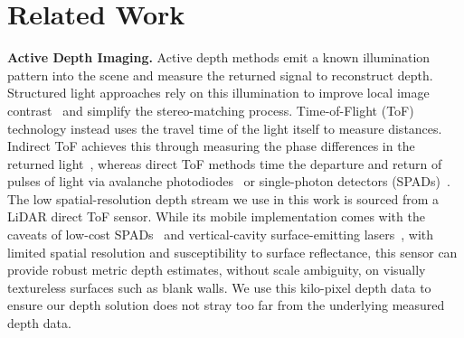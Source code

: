 \section{Related Work}
\vspace{0.5em}\noindent\textbf{Active Depth Imaging.}\hspace{0.1em}
Active depth methods emit a known illumination pattern into the scene and measure the returned signal to reconstruct depth. Structured light approaches rely on this illumination to improve local image contrast~\cite{zhang2018high, scharstein2003high} and simplify the stereo-matching process. Time-of-Flight (ToF) technology instead uses the travel time of the light itself to measure distances. Indirect ToF achieves this through measuring the phase differences in the returned light~\cite{lange20003d}, whereas direct ToF methods time the departure and return of pulses of light via avalanche photodiodes~\cite{cova1996avalanche} or single-photon detectors (SPADs)~\cite{mccarthy2009long}. The low spatial-resolution depth stream we use in this work is sourced from a LiDAR direct ToF sensor. While its mobile implementation comes with the caveats of low-cost SPADs~\cite{callenberg2021low} and vertical-cavity surface-emitting lasers~\cite{warren2018low}, with limited spatial resolution and susceptibility to surface reflectance, this sensor can provide robust metric depth estimates, without scale ambiguity, on visually textureless surfaces such as blank walls. We use this kilo-pixel depth data to ensure our depth solution does not stray too far from the underlying measured depth data.


